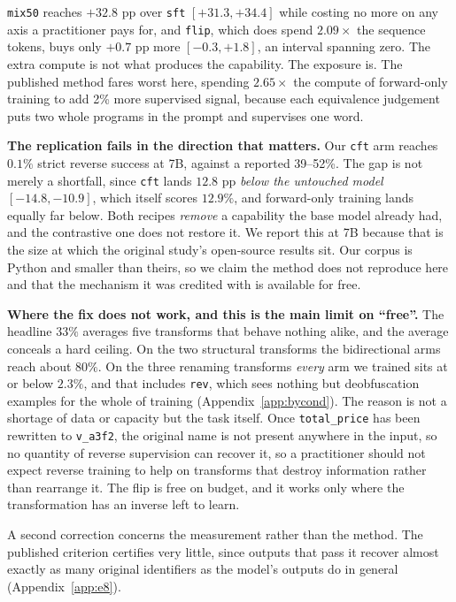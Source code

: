 \documentclass{article}
\newcommand{\arm}[1]{\texttt{#1}}
\begin{document}
\arm{mix50} reaches $+32.8$ pp over \arm{sft} $[+31.3,+34.4]$ while costing no more on any axis
a practitioner pays for, and \arm{flip}, which does spend $2.09\times$ the sequence tokens,
buys only $+0.7$ pp more $[-0.3,+1.8]$, an interval spanning zero. The extra compute is not
what produces the capability. The exposure is. The published method fares worst here, spending
$2.65\times$ the compute of forward-only training to add 2\% more supervised signal, because
each equivalence judgement puts two whole programs in the prompt and supervises one word.

\textbf{The replication fails in the direction that matters.} Our \arm{cft} arm reaches
$0.1\%$ strict reverse success at 7B, against a reported 39--52\%. The gap is not merely a shortfall, since \arm{cft}
lands $12.8$ pp \emph{below the untouched model} $[-14.8,-10.9]$, which itself scores $12.9\%$,
and forward-only training lands equally far below. Both recipes \emph{remove} a capability the
base model already had, and the contrastive one does not restore it. We report this at 7B
because that is the size at which the original study's open-source results sit. Our corpus is
Python and smaller than theirs, so we claim the method does not reproduce here and that the
mechanism it was credited with is available for free.

\textbf{Where the fix does not work, and this is the main limit on ``free''.} The headline
$33\%$ averages five transforms that behave nothing alike, and the average conceals a hard
ceiling. On the two structural transforms the bidirectional arms reach about $80\%$. On the
three renaming transforms \emph{every} arm we trained sits at or below $2.3\%$, and that
includes \arm{rev}, which sees nothing but deobfuscation examples for the whole of training
(Appendix~\ref{app:bycond}). The reason is not a shortage of data or capacity but the task
itself. Once \texttt{total\_price} has been rewritten to \texttt{v\_a3f2}, the original name
is not present anywhere in the input, so no quantity of reverse supervision can recover it,
so a practitioner should not expect reverse training to help on transforms that destroy
information rather than rearrange it. The flip is free on budget, and it works only where the
transformation has an inverse left to learn.

A second correction concerns the measurement rather than the method. The published criterion
certifies very little, since outputs that pass it recover almost exactly as many original
identifiers as the model's outputs do in general (Appendix~\ref{app:e8}).
\end{document}
